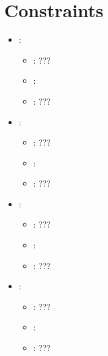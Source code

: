 \section{Constraints}


\begin{itemize}
    \item {}:
           \begin{itemize}
                \item \optionPossibleValues{}: ???
                \item \optionDefaultValue{}: 
                \item \optionDescrption{}: ???
           \end{itemize}
    \item {}:
           \begin{itemize}
                \item \optionPossibleValues{}: ???
                \item \optionDefaultValue{}: 
                \item \optionDescrption{}: ???
           \end{itemize}
    \item {}:
           \begin{itemize}
                \item \optionPossibleValues{}: ???
                \item \optionDefaultValue{}: 
                \item \optionDescrption{}: ???
           \end{itemize}
    \item {}:
           \begin{itemize}
                \item \optionPossibleValues{}: ???
                \item \optionDefaultValue{}: 
                \item \optionDescrption{}: ???
           \end{itemize}
\end{itemize}




